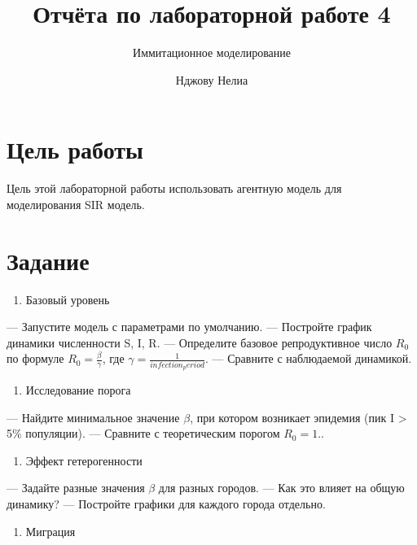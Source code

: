 \documentclass[
  12pt,
  a4paper,
  DIV=11,
  numbers=noendperiod]{scrreprt}
\title{Отчёта по лабораторной работе 4}
\subtitle{Иммитационное моделирование}
\author{Нджову Нелиа}
\date{}
\providecommand{\tightlist}{%
  \setlength{\itemsep}{0pt}\setlength{\parskip}{0pt}}\usepackage{longtable,booktabs,array}
\renewcommand*\contentsname{Содержание}
\newcommand\contentsname{Содержание}
\begin{document}
\maketitle

\renewcommand*\contentsname{Содержание}
{
\setcounter{tocdepth}{1}
\tableofcontents
}
\listoffigures
\listoftables
{}
\chapter{Цель
работы}\label{ux446ux435ux43bux44c-ux440ux430ux431ux43eux442ux44b}

Цель этой лабораторной работы использовать агентную модель для
моделирования SIR модель.

\chapter{Задание}\label{ux437ux430ux434ux430ux43dux438ux435}

\begin{enumerate}
\def\labelenumi{\arabic{enumi}.}
\tightlist
\item
  Базовый уровень
\end{enumerate}

--- Запустите модель с параметрами по умолчанию. --- Постройте график
динамики численности S, I, R. --- Определите базовое репродуктивное
число \(R_0\) по формуле \(R_0 = \frac{\beta}{\gamma}\), где
\(\gamma = \frac{1}{infection_period}\). --- Сравните с наблюдаемой
динамикой.

\begin{enumerate}
\def\labelenumi{\arabic{enumi}.}
\setcounter{enumi}{1}
\tightlist
\item
  Исследование порога
\end{enumerate}

--- Найдите минимальное значение \(\beta\), при котором возникает
эпидемия (пик I \textgreater{} 5\% популяции). --- Сравните с
теоретическим порогом \(R_0 = 1.\).

\begin{enumerate}
\def\labelenumi{\arabic{enumi}.}
\setcounter{enumi}{2}
\tightlist
\item
  Эффект гетерогенности
\end{enumerate}

--- Задайте разные значения \(\beta\) для разных городов. --- Как это
влияет на общую динамику? --- Постройте графики для каждого города
отдельно.

\begin{enumerate}
\def\labelenumi{\arabic{enumi}.}
\setcounter{enumi}{3}
\tightlist
\item
  Миграция
\end{enumerate}
\end{document}
